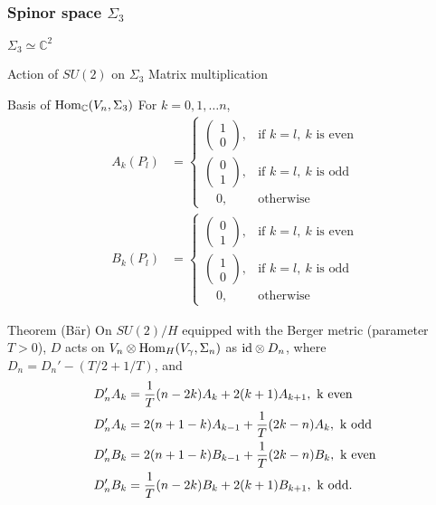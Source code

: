 \documentclass{beamer}
\def\C{{\mathbb C}}
\def\Hom{{\rm Hom}}
\def\id{{\rm id}}
\begin{document}
\begin{frame}
	\frametitle{Spinor space $\Sigma_3$}
	\begin{block}{$\Sigma_3 \simeq \C ^2$}
	\end{block}
	\begin{block}{Action of $SU(2)$ on $\Sigma_3$}
		Matrix multiplication
	\end{block}
\end{frame}

\begin{frame}
	\begin{block}{Basis of $\Hom_{\C}(V_n, \Sigma_3)$}
	For $k = 0,1,\ldots n$,
	\begin{align*}
A_k(P_l) & = \begin{cases}
\left( \begin{array}{c}
1\\
0
\end{array} \right),
 & \mbox{if } k=l,~k\mbox{ is even} \\
\left( \begin{array}{c}
0\\
1
\end{array} \right),
& \mbox{if } k=l,~k\mbox{ is odd}\\
\quad 0,
& \mbox{otherwise}
 \end{cases} \\
B_k(P_l) & = \begin{cases}
\left( \begin{array}{c}
0\\
1
\end{array} \right),
 & \mbox{if } k=l,~k\mbox{ is even} \\
\left( \begin{array}{c}
1\\
0
\end{array} \right),
& \mbox{if } k=l,~k\mbox{ is odd}\\
\quad 0,
& \mbox{otherwise}
 \end{cases}
\end{align*}
	\end{block}
\end{frame}

\begin{frame}
	\begin{block}{Theorem (B\"ar)}
		On $SU(2)/ H$ equipped with the Berger metric (parameter $T>0$), $D$ acts on $V_n \otimes \Hom_{H}(V_{\gamma},\Sigma_n)$ as $\id \otimes D_n$, where $D_n = D_n' -(T/2 + 1/T)$, and
	\begin{align*}
	D_n ' A_k & = \frac{1}{T}(n-2k)A_k + 2(k+1)A_{k+1},~\rm{k~even} \\
	D_n ' A_k & = 2(n+1-k) A_{k-1} + \frac{1}{T}(2k - n)A_k,~\rm{k~odd}\\
	D_n ' B_k & = 2(n+1-k) B_{k-1} + \frac{1}{T}(2k - n)B_k,~\rm{k~even}\\
	D_n ' B_k & = \frac{1}{T}(n-2k)B_k + 2(k+1)B_{k+1},~\rm{k~odd}.
	\end{align*}	
	\end{block}
\end{frame}
\end{document}

